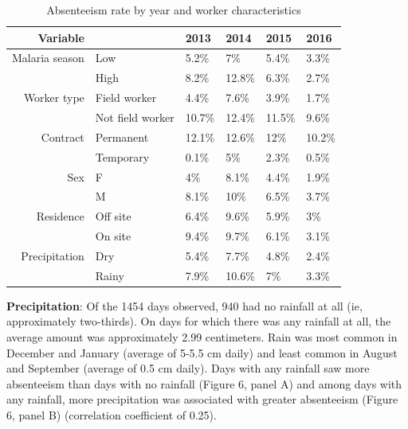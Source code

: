 \documentclass[]{article}
\begin{document}
\begin{table}[ht]
\centering
\begin{tabular}{rlllll}
  \hline
Variable &  & 2013 & 2014 & 2015 & 2016 \\ 
  \hline
Malaria season & Low & 5.2\% & 7\% & 5.4\% & 3.3\% \\ 
   & High & 8.2\% & 12.8\% & 6.3\% & 2.7\% \\ 
  Worker type & Field worker & 4.4\% & 7.6\% & 3.9\% & 1.7\% \\ 
   & Not field worker & 10.7\% & 12.4\% & 11.5\% & 9.6\% \\ 
  Contract & Permanent & 12.1\% & 12.6\% & 12\% & 10.2\% \\ 
   & Temporary & 0.1\% & 5\% & 2.3\% & 0.5\% \\ 
  Sex & F & 4\% & 8.1\% & 4.4\% & 1.9\% \\ 
   & M & 8.1\% & 10\% & 6.5\% & 3.7\% \\ 
  Residence & Off site & 6.4\% & 9.6\% & 5.9\% & 3\% \\ 
   & On site & 9.4\% & 9.7\% & 6.1\% & 3.1\% \\ 
  Precipitation & Dry & 5.4\% & 7.7\% & 4.8\% & 2.4\% \\ 
   & Rainy & 7.9\% & 10.6\% & 7\% & 3.3\% \\ 
   \hline
\end{tabular}
\caption{Absenteeism rate by year and worker characteristics} 
\end{table}

\textbf{Precipitation}: Of the 1454 days observed, 940 had no rainfall
at all (ie, approximately two-thirds). On days for which there was any
rainfall at all, the average amount was approximately 2.99 centimeters.
Rain was most common in December and January (average of 5-5.5 cm daily)
and least common in August and September (average of 0.5 cm daily). Days
with any rainfall saw more absenteeism than days with no rainfall
(Figure 6, panel A) and among days with any rainfall, more precipitation
was associated with greater absenteeism (Figure 6, panel B) (correlation
coefficient of 0.25).
\end{document}
